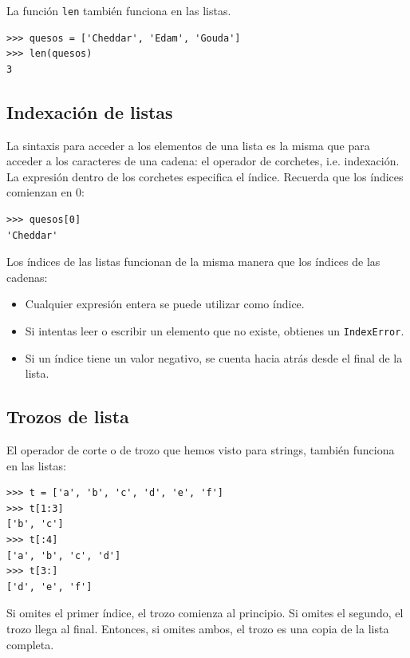 La función \texttt{len} también funciona en las listas.

\begin{Verbatim}[frame=single]
>>> quesos = ['Cheddar', 'Edam', 'Gouda']
>>> len(quesos)
3
\end{Verbatim}


\subsection{Indexación de listas}

La sintaxis para acceder a los elementos de una lista es la misma que para
acceder a los caracteres de una cadena: el operador de corchetes, i.e. indexación.  La
expresión dentro de los corchetes especifica el índice.  Recuerda que los
índices comienzan en 0:

\begin{Verbatim}[frame=single]
>>> quesos[0]
'Cheddar'
\end{Verbatim}
%

Los índices de las listas funcionan de la misma manera que los índices de las cadenas:

\begin{itemize}

\item Cualquier expresión entera se puede utilizar como índice.

\item Si intentas leer o escribir un elemento que no existe,
obtienes un \texttt{IndexError}.

\item Si un índice tiene un valor negativo, se cuenta hacia atrás desde el
final de la lista.

\end{itemize}



\subsection{Trozos de lista}

El operador de corte o de trozo que hemos visto para strings, también funciona en las listas:

\begin{Verbatim}[frame=single]
>>> t = ['a', 'b', 'c', 'd', 'e', 'f']
>>> t[1:3]
['b', 'c']
>>> t[:4]
['a', 'b', 'c', 'd']
>>> t[3:]
['d', 'e', 'f']
\end{Verbatim}
%
Si omites el primer índice, el trozo comienza al principio.
Si omites el segundo, el trozo llega al final.  Entonces, si
omites ambos, el trozo es una copia de la lista completa.







